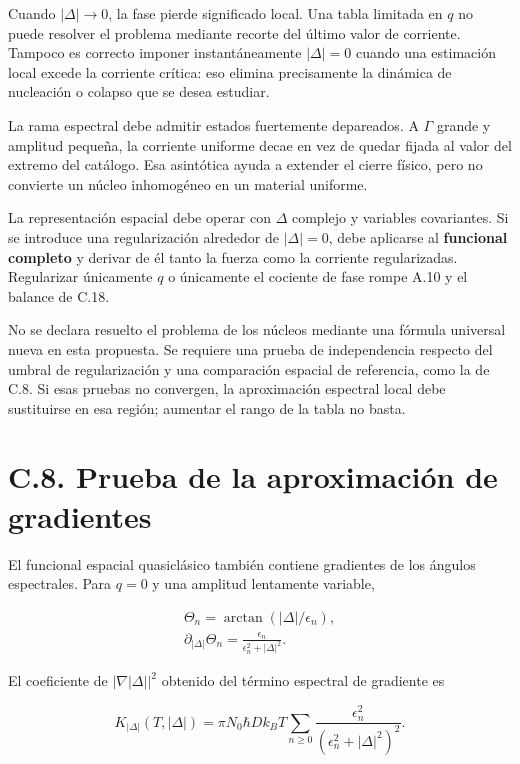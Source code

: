 \documentclass[
  spanish,
  10pt,
  a4paper,
]{article}
\begin{document}
Cuando \(|\Delta|\to0\), la fase pierde significado local. Una tabla
limitada en \(q\) no puede resolver el problema mediante recorte del
último valor de corriente. Tampoco es correcto imponer instantáneamente
\(|\Delta|=0\) cuando una estimación local excede la corriente crítica:
eso elimina precisamente la dinámica de nucleación o colapso que se
desea estudiar.

La rama espectral debe admitir estados fuertemente depareados. A
\(\Gamma\) grande y amplitud pequeña, la corriente uniforme decae en vez
de quedar fijada al valor del extremo del catálogo. Esa asintótica ayuda
a extender el cierre físico, pero no convierte un núcleo inhomogéneo en
un material uniforme.

La representación espacial debe operar con \(\Delta\) complejo y
variables covariantes. Si se introduce una regularización alrededor de
\(|\Delta|=0\), debe aplicarse al \textbf{funcional completo} y derivar
de él tanto la fuerza como la corriente regularizadas. Regularizar
únicamente \(q\) o únicamente el cociente de fase rompe A.10 y el
balance de C.18.

No se declara resuelto el problema de los núcleos mediante una fórmula
universal nueva en esta propuesta. Se requiere una prueba de
independencia respecto del umbral de regularización y una comparación
espacial de referencia, como la de C.8. Si esas pruebas no convergen, la
aproximación espectral local debe sustituirse en esa región; aumentar el
rango de la tabla no basta.

\section{C.8. Prueba de la aproximación de
gradientes}\label{c.8.-prueba-de-la-aproximaciuxf3n-de-gradientes}

El funcional espacial quasiclásico también contiene gradientes de los
ángulos espectrales. Para \(q=0\) y una amplitud lentamente variable,

\[
\begin{gathered}
\Theta_n=\arctan(|\Delta|/\epsilon_n),\\
\partial_{|\Delta|}\Theta_n=\frac{\epsilon_n}{\epsilon_n^2+|\Delta|^2}.
\end{gathered}
\]

El coeficiente de \(|\nabla |\Delta||^2\) obtenido del término espectral
de gradiente es

\[
K_{|\Delta|}(T,|\Delta|)=\pi N_0\hbar D k_BT
\sum_{n\geq0}\frac{\epsilon_n^2}{(\epsilon_n^2+|\Delta|^2)^2}. \tag{C.27}
\]
\end{document}
